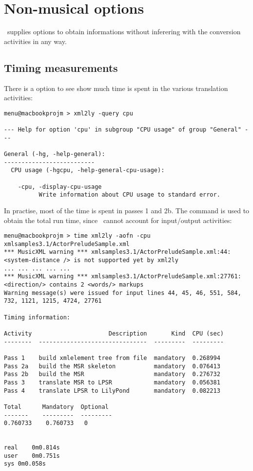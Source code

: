 
\chapter{Non-musical options}

\mf\ supplies options to obtain informations without inferering with the conversion activities in any way.


\section{Timing measurements}

There is a  option to see show much time is spent in the various translation activities:
\begin{lstlisting}[language=MusicXML]
menu@macbookprojm > xml2ly -query cpu

--- Help for option 'cpu' in subgroup "CPU usage" of group "General" ---

General (-hg, -help-general):
--------------------------
  CPU usage (-hgcpu, -help-general-cpu-usage):

    -cpu, -display-cpu-usage
          Write information about CPU usage to standard error.
\end{lstlisting}

In practise, most of the time is spent in passes 1 and 2b. The  command is used to obtain the total run time, since \xmlToLy\ cannot account for input/output activities:
\begin{lstlisting}[language=MusicXML]
menu@macbookprojm > time xml2ly -aofn -cpu xmlsamples3.1/ActorPreludeSample.xml
*** MusicXML warning *** xmlsamples3.1/ActorPreludeSample.xml:44: <system-distance /> is not supported yet by xml2ly
... ... ... ... ...
*** MusicXML warning *** xmlsamples3.1/ActorPreludeSample.xml:27761: <direction/> contains 2 <words/> markups
Warning message(s) were issued for input lines 44, 45, 46, 551, 584, 732, 1121, 1215, 4724, 27761

Timing information:

Activity                      Description       Kind  CPU (sec)
--------  -------------------------------  ---------  ---------

Pass 1    build xmlelement tree from file  mandatory  0.268994
Pass 2a   build the MSR skeleton           mandatory  0.076413
Pass 2b   build the MSR                    mandatory  0.276732
Pass 3    translate MSR to LPSR            mandatory  0.056381
Pass 4    translate LPSR to LilyPond       mandatory  0.082213

Total      Mandatory  Optional
-------    ---------  ---------
0.760733    0.760733   0


real	0m0.814s
user	0m0.751s
sys	0m0.058s
\end{lstlisting}

